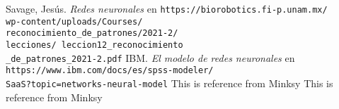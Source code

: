 \documentclass[12pt]{article}
\begin{document}
  \begin{thebibliography}{9}
    \addtolength{\leftmargin}{0.8in}
    \setlength{\itemindent}{-0.4in}
      Savage, Jesús. \textit{Redes neuronales} en 
      \texttt{https://biorobotics.fi-p.unam.mx/\\wp-content/uploads/Courses/\\
      reconocimiento\_de\_patrones/2021-2/\\lecciones/%
      leccion12\_reconocimiento\\\_de\_patrones\_2021-2.pdf}
      IBM. \textit{El modelo de redes  neuronales} en 
      \texttt{https://www.ibm.com/docs/es/spss-modeler/\\
      SaaS?topic=networks-neural-model}
     This is reference from Minksy
     This is reference from Minksy

  \end{thebibliography}

\end{document}
